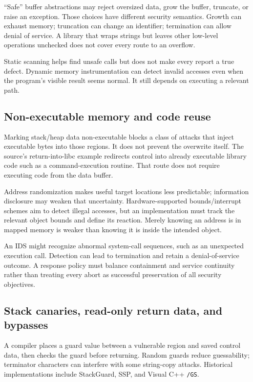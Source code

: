 \documentclass[11pt,a4paper]{article}
\numberwithin{figure}{section}
\begin{document}
``Safe'' buffer abstractions may reject oversized data, grow the buffer, truncate, or raise an exception. Those choices have different security semantics. Growth can exhaust memory; truncation can change an identifier; termination can allow denial of service. A library that wraps strings but leaves other low-level operations unchecked does not cover every route to an overflow.

Static scanning helps find unsafe calls but does not make every report a true defect. Dynamic memory instrumentation can detect invalid accesses even when the program's visible result seems normal. It still depends on executing a relevant path.

\subsection{Non-executable memory and code reuse}
Marking stack/heap data non-executable blocks a class of attacks that inject executable bytes into those regions. It does not prevent the overwrite itself. The source's return-into-libc example redirects control into already executable library code such as a command-execution routine. That route does not require executing code from the data buffer.

Address randomization makes useful target locations less predictable; information disclosure may weaken that uncertainty. Hardware-supported bounds/interrupt schemes aim to detect illegal accesses, but an implementation must track the relevant object bounds and define its reaction. Merely knowing an address is in mapped memory is weaker than knowing it is inside the intended object.

An IDS might recognize abnormal system-call sequences, such as an unexpected execution call. Detection can lead to termination and retain a denial-of-service outcome. A response policy must balance containment and service continuity rather than treating every abort as successful preservation of all security objectives.

\subsection{Stack canaries, read-only return data, and bypasses}
A compiler places a guard value between a vulnerable region and saved control data, then checks the guard before returning. Random guards reduce guessability; terminator characters can interfere with some string-copy attacks. Historical implementations include StackGuard, SSP, and Visual C++ \texttt{/GS}.
\end{document}
